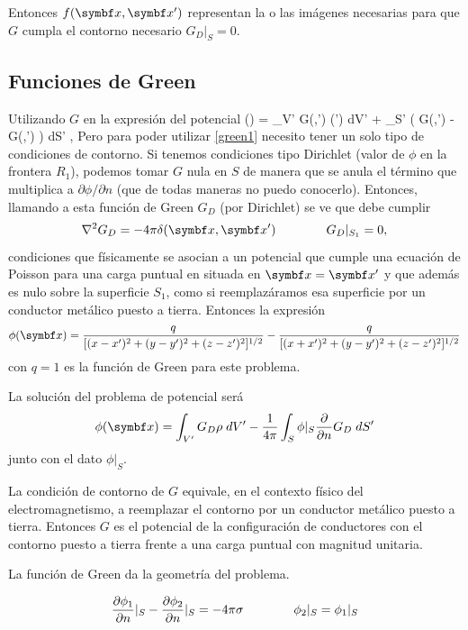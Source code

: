 \documentclass[10pt,oneside]{CBFT_book}
\begin{document}
Entonces $f( \vb{x}, \vb{x}' )$ representan la o las imágenes necesarias para que $G$ cumpla el contorno
necesario $G_D|_S=0$.


\subsection{Funciones de Green}

Utilizando $G$ en la expresión del potencial
\be
	\phi() = \int_{V'} G(,') \rho(')  \; dV' +
	 \int_{S'} \left( G(,') -\phi{} G(,') \right)\; dS' ,
	\label{green1}
\ee
Pero para poder utilizar \eqref{green1} necesito tener un solo tipo de condiciones de contorno.
Si tenemos condiciones tipo Dirichlet (valor de $\phi$ en la frontera $R_1$), podemos tomar $G$ nula 
en $S$ de manera que se anula el término que multiplica a $\partial \phi / \partial n$ (que de todas
maneras no puedo conocerlo).
Entonces, llamando a esta función de Green $G_D$ (por Dirichlet) se ve que debe cumplir 
\[
	\lapm{G_D} = -4 \pi \delta(\vb{x},\vb{x}') \qquad \qquad G_D |_{S_1} = 0,
\]
condiciones que físicamente se asocian a un potencial que cumple una ecuación de Poisson para una carga 
puntual en situada en $ \vb{x} = \vb{x}' $ y que además es nulo sobre la superficie $S_1$, como si 
reemplazáramos esa superficie por un conductor metálico puesto a tierra.
Entonces la expresión 
\[
	\phi(\vb{x}) = \frac{q}{[ (x-x')^2 + (y-y')^2 + (z-z')^2 ]^{1/2}} - 
	\frac{q}{[ (x+x')^2 + (y-y')^2 + (z-z')^2 ]^{1/2}}	
\]
con $q=1$ es la función de Green para este problema.

La solución del problema de potencial será 
\[
	\phi(\vb{x}) = \displaystyle \int_{V'} G_D \rho \; dV' - \frac{1}{4\pi}
				\int_{S} \phi|_S\frac{\partial}{\partial n} G_D \; dS'
\]
junto con el dato $ \phi|_S $.

La condición de contorno de $G$ equivale, en el contexto físico del electromagnetismo, a
reemplazar el contorno por un conductor metálico puesto a tierra.
Entonces $G$ es el potencial de la configuración de conductores con el contorno puesto a tierra
frente a una carga puntual con magnitud unitaria.

La función de Green da la geometría del problema.

\[
	\frac{\partial^{\hspace{-0.05em}} {\phi_1}}{\partial {n}^{\hspace{-0.05em}}}|_S - \frac{\partial^{\hspace{-0.05em}} {\phi_2}}{\partial {n}^{\hspace{-0.05em}}}|_S = -4\pi\sigma \qquad \qquad \phi_2|_S = \phi_1|_S
\]
\end{document}
